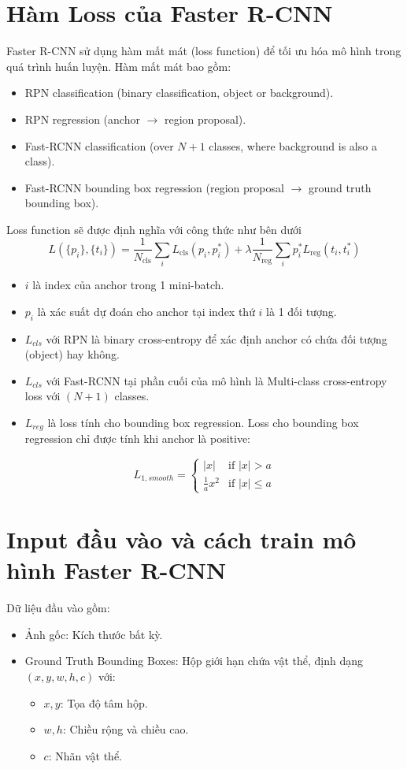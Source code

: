 \documentclass{article}
\begin{document}
\section{Hàm Loss của Faster R-CNN}
Faster R-CNN sử dụng hàm mất mát (loss function) để tối ưu hóa mô hình trong quá trình huấn luyện. Hàm mất mát bao gồm:
\begin{itemize}
    \item RPN classification (binary classification, object or background).
    \item RPN regression (anchor $\rightarrow$ region proposal).
    \item Fast-RCNN classification (over $N+1$ classes, where background is also a class).
    \item Fast-RCNN bounding box regression (region proposal $\rightarrow$ ground truth bounding box).
\end{itemize}
Loss function sẽ được định nghĩa với công thức như bên dưới
\[
L(\{p_i\}, \{t_i\}) = \frac{1}{N_{\text{cls}}} \sum_i L_{\text{cls}}(p_i, p_i^*) + \lambda \frac{1}{N_{\text{reg}}} \sum_i p_i^* L_{\text{reg}}(t_i, t_i^*)
\]
\begin{itemize}
    \item $i$ là index của anchor trong 1 mini-batch.
    \item $p_i$ là xác suất dự đoán cho anchor tại index thứ $i$ là 1 đối tượng.
    \item $L_{cls}$ với RPN là binary cross-entropy để xác định anchor có chứa đối tượng (object) hay không.
    \item $L_{cls}$ với Fast-RCNN tại phần cuối của mô hình là Multi-class cross-entropy loss với $(N + 1)$ classes.
    \item $L_{reg}$ là loss tính cho bounding box regression. Loss cho bounding box regression chỉ được tính khi anchor là positive:
\end{itemize}
\[
L_{1,smooth} = 
\begin{cases} 
|x| & \text{if } |x| > a \\
\frac{1}{a} x^2 & \text{if } |x| \leq a
\end{cases}
\]

\section{Input đầu vào và cách train mô hình Faster R-CNN}
Dữ liệu đầu vào gồm:
\begin{itemize}
    \item Ảnh gốc: Kích thước bất kỳ.
    \item Ground Truth Bounding Boxes: Hộp giới hạn chứa vật thể, định dạng $(x, y, w, h, c)$ với:
    \begin{itemize}
        \item $x, y$: Tọa độ tâm hộp.
        \item $w, h$: Chiều rộng và chiều cao.
        \item $c$: Nhãn vật thể.
    \end{itemize}
\end{itemize}
\end{document}
